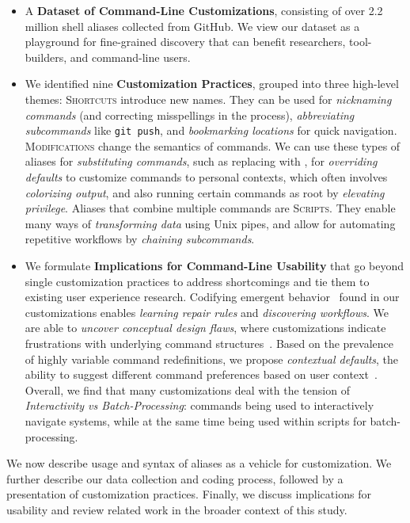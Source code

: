 \begin{itemize}
	\item A \textbf{Dataset of Command-Line Customizations}, consisting of over 2.2 million shell aliases collected from GitHub.
	We view our dataset as a playground for fine-grained discovery that can benefit researchers, tool-builders, and command-line users.
	\smallskip
	
	\item We identified nine \textbf{Customization Practices}, grouped into three high-level themes:
	\textsc{Shortcuts} introduce new names.
	They can be used for \emph{nicknaming commands} (and correcting misspellings in the process),
	\emph{abbreviating subcommands} like \texttt{git push},
	and \emph{bookmarking locations} for quick navigation.
	\textsc{Modifications} change the semantics of commands.
	We can use these types of aliases for \emph{substituting commands}, such as replacing  with ,
	for \emph{overriding defaults} to customize commands to personal contexts, 
	which often involves \emph{colorizing output},
	and also running certain commands as root by \emph{elevating privilege}.
	Aliases that combine multiple commands are \textsc{Scripts}.
	They enable many ways of \emph{transforming data} using Unix pipes, 
	and allow for automating repetitive workflows by \emph{chaining subcommands}.
	\smallskip
	
	\item We formulate \textbf{Implications for Command-Line Usability} that go beyond single customization practices to address shortcomings and tie them to existing user experience research.
	Codifying emergent behavior~\citep{fast:14} found in our customizations enables \emph{learning repair rules} and \emph{discovering workflows}.
	We are able to \emph{uncover conceptual design flaws}, where customizations indicate frustrations with underlying command structures~\citep{perez:13}.
	Based on the prevalence of highly variable command redefinitions, we propose \emph{contextual defaults}, the ability to suggest different command preferences based on user context~\citep{stefanidis:11}.
	Overall, we find that many customizations deal with the tension of \emph{Interactivity vs Batch-Processing}: commands being used to interactively navigate systems, while at the same time being used within scripts for batch-processing.
\end{itemize}

We now describe usage and syntax of aliases as a vehicle for customization. We further describe our data collection and coding process, followed by a presentation of customization practices. Finally, we discuss implications for usability and review related work in the broader context of this study.
